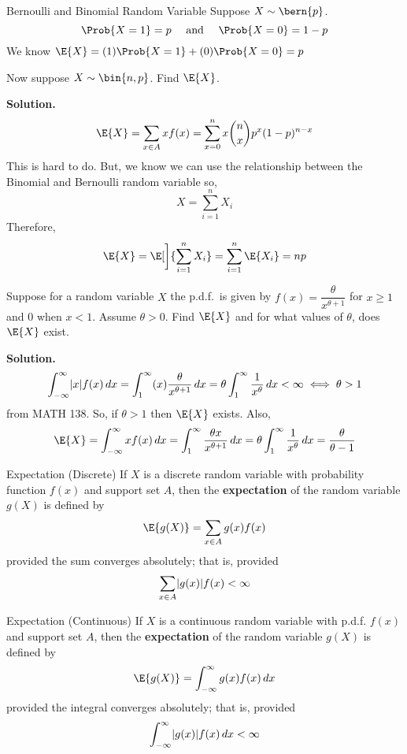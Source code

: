 \begin{Example}{Bernoulli and Binomial Random Variable}{}
    Suppose $ X \sim \bern{p} $.
    \[ \Prob{X=1}=p\quad\text{ and }\quad \Prob{X=0}=1-p \]
    We know $ \E{X}=(1)\Prob{X=1}+(0)\Prob{X=0}=p $

    Now suppose
    $ X \sim \bin{n,p} $. Find $ \E{X} $.

    \textbf{Solution.}
    \[ \E{X}=\sum\limits_{x\in A}x f(x)=\sum\limits_{x=0}^{n} x
        \binom{n}{x}p^x(1-p)^{n-x}  \]
    This is hard to do. But, we know we can use the
    relationship between the Binomial and Bernoulli random variable
    so,
    \[ X=\sum\limits_{i=1}^{n} X_i \]
    Therefore,
    \[ \E{X}=\E[\bigg]{\sum\limits_{i=1}^{n} X_i}=\sum\limits_{i=1}^{n}
        \E{X_i}=np \]
\end{Example}
\begin{Example}{}{}
    Suppose for a random variable $ X $ the p.d.f.\ is given by
    $ f(x)=\dfrac{\theta}{x^{\theta+1}} $
    for $ x\geqslant 1 $ and $ 0 $ when $ x<1 $. Assume $ \theta>0 $.
    Find $ \E{X} $ and for what values of $ \theta $,
    does $ \E{X} $ exist.

    \textbf{Solution.}
    \[ \int_{-\infty}^{\infty} \lvert x\rvert f(x)\, d{x}=
        \int_{1}^{\infty} (x) \frac{\theta}{x^{\theta+1}} \, d{x}
        =\theta \int_{1}^{\infty} \frac{1}{x^{\theta}} \, d{x} <\infty
        \iff \theta>1 \]
    from MATH 138. So, if $ \theta>1 $ then $ \E{X} $ exists. Also,
    \[ \E{X}=\int_{-\infty}^{\infty} xf(x)\, d{x}=
        \int_{1}^{\infty} \frac{\theta x}{x^{\theta+1}} \, d{x}
        =\theta \int_{1}^{\infty} \frac{1}{x^{\theta}} \, d{x}
        =\frac{\theta}{\theta-1}   \]

\end{Example}

\begin{Definition}{Expectation (Discrete)}{}
    If $ X $ is a discrete random variable with probability
    function $ f(x) $ and support set $ A $,
    then the \textbf{expectation} of the random variable $ g(X) $
    is defined by
    \[ \E{g(X)}=\sum\limits_{x\in A}g(x)f(x) \]
    provided the sum converges absolutely; that is, provided
    \[ \sum\limits_{x\in A}\lvert g(x)\rvert f(x)<\infty \]
\end{Definition}

\begin{Definition}{Expectation (Continuous)}{}
    If $ X $ is a continuous random variable with p.d.f.
    $ f(x) $ and support set $ A $,
    then the \textbf{expectation} of the random variable $ g(X) $
    is defined by
    \[ \E{g(X)}=\int_{-\infty}^{\infty} g(x)f(x)\, d{x} \]
    provided the integral converges absolutely; that is, provided
    \[ \int_{-\infty}^{\infty} \lvert g(x)\rvert f(x)\, d{x} <\infty \]
\end{Definition}

